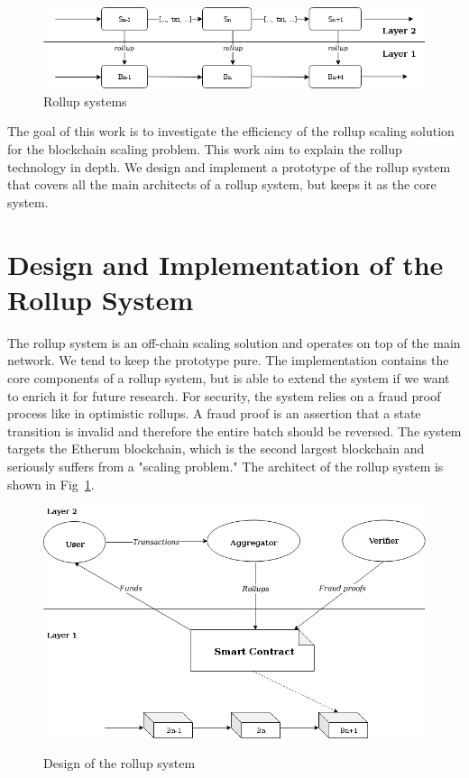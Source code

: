 \documentclass{article}
\begin{document}

\begin{figure}[t]
\caption{Rollup systems}
\includegraphics[width=12cm]{rollup-batch}
\centering
\end{figure}

The goal of this work is to investigate the efficiency of the rollup scaling solution for the blockchain scaling problem. This work aim to explain the rollup technology in depth.  We design and implement a prototype of the rollup system that covers all the main architects of a rollup system, but keeps it as the core system.

\section{Design and Implementation of the Rollup System}
The rollup system is an off-chain scaling solution and operates on top of the main network. We tend to keep the prototype pure. The implementation contains the core components of a rollup system, but is able to extend the system if we want to enrich it for future research. For security, the system relies on a fraud proof process like in optimistic rollups. A fraud proof is an assertion that a state transition is invalid and therefore the entire batch should be reversed. The system targets the Etherum blockchain, which is the second largest blockchain and seriously suffers from a "scaling problem." The architect of the rollup system is shown in Fig~\ref{rollup-design}.
\begin{figure}[t]
\caption{Design of the rollup system}
\includegraphics[width=12cm]{rollup-design.png}
\centering
\label{rollup-design}
\end{figure}
\end{document}
